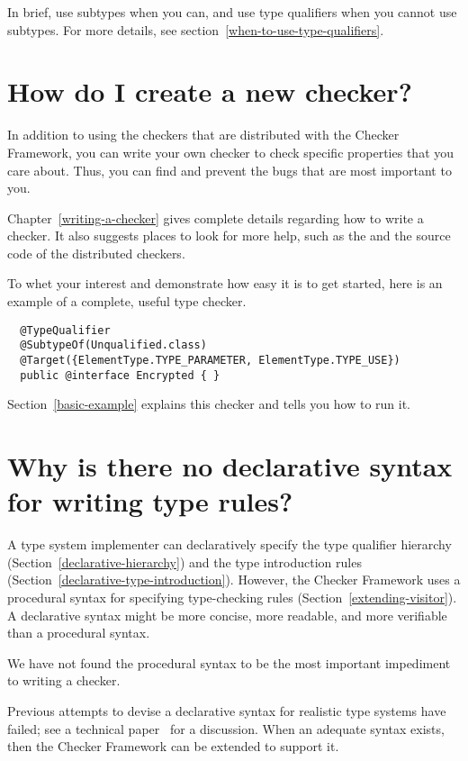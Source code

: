 In brief, use subtypes when you can, and use type qualifiers when you cannot
use subtypes.
For more details, see section~\ref{when-to-use-type-qualifiers}.


\section{How do I create a new checker?\label{faq-create-a-checker}}

In addition to using the checkers that are distributed with the Checker
Framework, you can write your own checker to check specific properties that
you care about.  Thus, you can find and prevent the bugs that are most
important to you.

Chapter~\ref{writing-a-checker} gives
complete details regarding how to write a checker.  It also suggests places
to look for more help, such as the  and the source code of the distributed
checkers.

To whet your interest and demonstrate how easy it is to get started, here
is an example of a complete, useful type checker.

\begin{Verbatim}
  @TypeQualifier
  @SubtypeOf(Unqualified.class)
  @Target({ElementType.TYPE_PARAMETER, ElementType.TYPE_USE})
  public @interface Encrypted { }
\end{Verbatim}

Section~\ref{basic-example} explains this checker and tells
you how to run it.


\section{Why is there no declarative syntax for writing type rules?\label{faq-declarative-syntax-for-type-rules}}

A type system implementer can declaratively specify the type qualifier
hierarchy (Section~\ref{declarative-hierarchy}) and the type introduction rules
(Section~\ref{declarative-type-introduction}).  However, the Checker
Framework uses a procedural syntax for specifying type-checking
rules (Section~\ref{extending-visitor}).
A declarative syntax might be more concise, more readable, and more
verifiable than a procedural syntax.

We have not found the procedural syntax to be the most important impediment
to writing a checker.

Previous attempts to devise a declarative syntax 
for realistic type systems have failed; see a technical
paper~\cite{PapiACPE2008} for a discussion.  When an
adequate syntax exists, then the Checker Framework can be extended to
support it.


